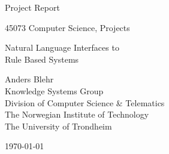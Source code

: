 
\begin{titlepage}
\begin{center}

\vspace*{1in}

{\large Project Report}

\vspace*{0.1in}

{\Large 45073 Computer Science, Projects}

\vspace*{0.8in}
\vspace*{0.8in}

{\Huge Natural Language Interfaces to\\}
\vspace*{0.05in}
{\Huge Rule Based Systems}

\vspace*{0.8in}

{\large Anders Blehr\\
Knowledge Systems Group\\
Division of Computer Science \& Telematics\\
The Norwegian Institute of Technology\\
The University of Trondheim}

\vspace*{0.8in}
\today
\vspace*{.5in}
\end{center}
\end{titlepage}
